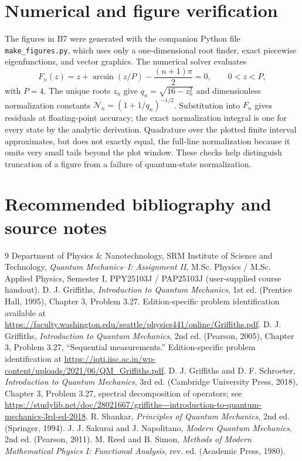 \documentclass[11pt,a4paper]{article}
\begin{document}
\section{Numerical and figure verification}\label{app:numerical}
The figures in B7 were generated with the companion Python file \texttt{make\_figures.py}, which uses only a one-dimensional root finder, exact piecewise eigenfunctions, and vector graphics. The numerical solver evaluates
\begin{equation}
F_n(z)=z+\arcsin(z/P)-\frac{(n+1)\pi}{2}=0,\qquad 0<z<P,
\end{equation}
with $P=4$. The unique roots $z_n$ give $q_n=\sqrt{16-z_n^2}$ and dimensionless normalization constants $\mathcal N_n=(1+1/q_n)^{-1/2}$. Substitution into $F_n$ gives residuals at floating-point accuracy; the exact normalization integral is one for every state by the analytic derivation. Quadrature over the plotted finite interval approximates, but does not exactly equal, the full-line normalization because it omits very small tails beyond the plot window. These checks help distinguish truncation of a figure from a failure of quantum-state normalization.

\section{Recommended bibliography and source notes}
\begin{thebibliography}{9}
 Department of Physics \& Nanotechnology, SRM Institute of Science and Technology, \emph{Quantum Mechanics--I: Assignment II}, M.Sc. Physics / M.Sc. Applied Physics, Semester I, PPY25103J / PAP25103J (user-supplied course handout).
 D. J. Griffiths, \emph{Introduction to Quantum Mechanics}, 1st ed. (Prentice Hall, 1995), Chapter 3, Problem 3.27. Edition-specific problem identification available at \url{https://faculty.washington.edu/seattle/physics441/online/Griffiths.pdf}.
 D. J. Griffiths, \emph{Introduction to Quantum Mechanics}, 2nd ed. (Pearson, 2005), Chapter 3, Problem 3.27, ``Sequential measurements.'' Edition-specific problem identification at \url{https://iqti.iisc.ac.in/wp-content/uploads/2021/06/QM_Griffiths.pdf}.
 D. J. Griffiths and D. F. Schroeter, \emph{Introduction to Quantum Mechanics}, 3rd ed. (Cambridge University Press, 2018), Chapter 3, Problem 3.27, spectral decomposition of operators; see \url{https://studylib.net/doc/28021667/griffiths---introduction-to-quantum-mechanics-3rd-ed-2018}.
 R. Shankar, \emph{Principles of Quantum Mechanics}, 2nd ed. (Springer, 1994).
 J. J. Sakurai and J. Napolitano, \emph{Modern Quantum Mechanics}, 2nd ed. (Pearson, 2011).
 M. Reed and B. Simon, \emph{Methods of Modern Mathematical Physics I: Functional Analysis}, rev. ed. (Academic Press, 1980).
\end{thebibliography}
\end{document}

